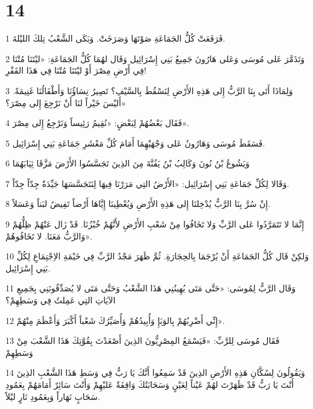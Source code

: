 \chapter{14}

\par 1 فَرَفَعَتْ كُلُّ الجَمَاعَةِ صَوْتَهَا وَصَرَخَتْ. وَبَكَى الشَّعْبُ تِلكَ الليْلةَ.
\par 2 وَتَذَمَّرَ عَلى مُوسَى وَعَلى هَارُونَ جَمِيعُ بَنِي إِسْرَائِيل وَقَال لهُمَا كُلُّ الجَمَاعَةِ: «ليْتَنَا مُتْنَا فِي أَرْضِ مِصْرَ أَوْ ليْتَنَا مُتْنَا فِي هَذَا القَفْرِ!
\par 3 وَلِمَاذَا أَتَى بِنَا الرَّبُّ إِلى هَذِهِ الأَرْضِ لِنَسْقُطَ بِالسَّيْفِ؟ تَصِيرُ نِسَاؤُنَا وَأَطْفَالُنَا غَنِيمَةً. أَليْسَ خَيْراً لنَا أَنْ نَرْجِعَ إِلى مِصْرَ؟»
\par 4 فَقَال بَعْضُهُمْ لِبَعْضٍ: «نُقِيمُ رَئِيساً وَنَرْجِعُ إِلى مِصْرَ».
\par 5 فَسَقَطَ مُوسَى وَهَارُونُ عَلى وَجْهَيْهِمَا أَمَامَ كُلِّ مَعْشَرِ جَمَاعَةِ بَنِي إِسْرَائِيل.
\par 6 وَيَشُوعُ بْنُ نُونَ وَكَالِبُ بْنُ يَفُنَّةَ مِنَ الذِينَ تَجَسَّسُوا الأَرْضَ مَزَّقَا ثِيَابَهُمَا
\par 7 وَقَالا لِكُلِّ جَمَاعَةِ بَنِي إِسْرَائِيل: «الأَرْضُ التِي مَرَرْنَا فِيهَا لِنَتَجَسَّسَهَا جَيِّدَةٌ جِدّاً جِدّاً.
\par 8 إِنْ سُرَّ بِنَا الرَّبُّ يُدْخِلنَا إِلى هَذِهِ الأَرْضِ وَيُعْطِينَا إِيَّاهَا أَرْضاً تَفِيضُ لبَناً وَعَسَلاً.
\par 9 إِنَّمَا لا تَتَمَرَّدُوا عَلى الرَّبِّ وَلا تَخَافُوا مِنْ شَعْبِ الأَرْضِ لأَنَّهُمْ خُبْزُنَا. قَدْ زَال عَنْهُمْ ظِلُّهُمْ وَالرَّبُّ مَعَنَا. لا تَخَافُوهُمْ».
\par 10 وَلكِنْ قَال كُلُّ الجَمَاعَةِ أَنْ يُرْجَمَا بِالحِجَارَةِ. ثُمَّ ظَهَرَ مَجْدُ الرَّبِّ فِي خَيْمَةِ الاِجْتِمَاعِ لِكُلِّ بَنِي إِسْرَائِيل.
\par 11 وَقَال الرَّبُّ لِمُوسَى: «حَتَّى مَتَى يُهِينُنِي هَذَا الشَّعْبُ وَحَتَّى مَتَى لا يُصَدِّقُونَنِي بِجَمِيعِ الآيَاتِ التِي عَمِلتُ فِي وَسَطِهِمْ؟
\par 12 إِنِّي أَضْرِبُهُمْ بِالوَبَإِ وَأُبِيدُهُمْ وَأُصَيِّرُكَ شَعْباً أَكْبَرَ وَأَعْظَمَ مِنْهُمْ».
\par 13 فَقَال مُوسَى لِلرَّبِّ: «فَيَسْمَعُ المِصْرِيُّونَ الذِينَ أَصْعَدْتَ بِقُوَّتِكَ هَذَا الشَّعْبَ مِنْ وَسَطِهِمْ
\par 14 وَيَقُولُونَ لِسُكَّانِ هَذِهِ الأَرْضِ الذِينَ قَدْ سَمِعُوا أَنَّكَ يَا رَبُّ فِي وَسَطِ هَذَا الشَّعْبِ الذِينَ أَنْتَ يَا رَبُّ قَدْ ظَهَرْتَ لهُمْ عَيْناً لِعَيْنٍ وَسَحَابَتُكَ وَاقِفَةٌ عَليْهِمْ وَأَنْتَ سَائِرٌ أَمَامَهُمْ بِعَمُودِ سَحَابٍ نَهَاراً وَبِعَمُودِ نَارٍ ليْلاً.
